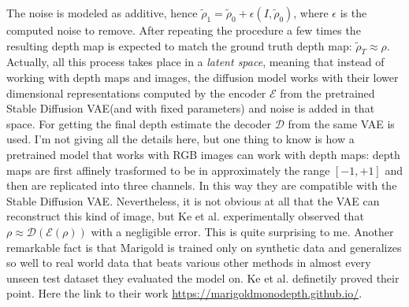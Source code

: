 The noise is modeled as additive, hence $\tilde{\rho}_{1} = \tilde{\rho}_{0} + \epsilon(I, \tilde{\rho}_{0})$, where $\epsilon$ is the computed noise to remove.
After repeating the procedure a few times the resulting depth map is expected to match the ground truth depth map: $\tilde{\rho}_{T} \approx \rho$.
Actually, all this process takes place in a \textit{latent space}, meaning that instead of working with depth maps and images, the diffusion model works with their lower dimensional representations computed by the encoder $\mathcal{E}$ from the pretrained Stable Diffusion VAE(and with fixed parameters) and noise is added in that space.
For getting the final depth estimate the decoder $\mathcal{D}$ from the same VAE is used.
I'm not giving all the details here, but one thing to know is how a pretrained model that works with RGB images can work with depth maps: depth maps are first affinely trasformed to be in approximately the range $[-1, +1]$ and then are replicated into three channels.
In this way they are compatible with the Stable Diffusion VAE.
Nevertheless, it is not obvious at all that the VAE can reconstruct this kind of image, but Ke et al. experimentally observed that $\rho \approx \mathcal{D}(\mathcal{E}(\rho))$ with a negligible error.
This is quite surprising to me.
Another remarkable fact is that Marigold is trained only on synthetic data and generalizes so well to real world data that beats various other methods in almost every unseen test dataset they evaluated the model on. Ke et al. definetily proved their point.
Here the link to their work \url{https://marigoldmonodepth.github.io/}.